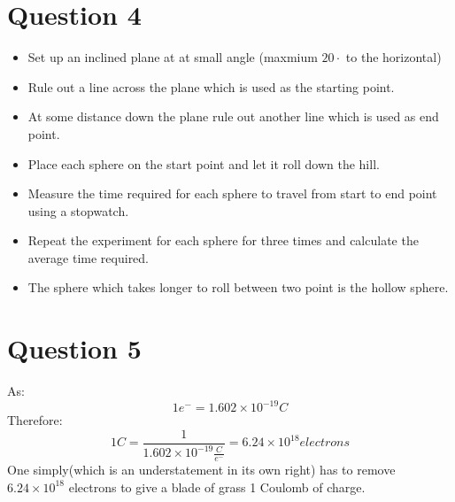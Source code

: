\documentclass[10pt]{article}
\begin{document}
\section{Question 4}
\begin{itemize}
\item Set up an inclined plane at at small angle (maxmium $20 \cdot$ to the horizontal)
\item Rule out a line across the plane which is used as the starting point.
\item At some distance down the plane rule out another line which is used as end point.
\item Place each sphere on the start point and let it roll down the hill.
\item Measure the time required for each sphere to travel from start to end point using a stopwatch.
\item Repeat the experiment for each sphere for three times and calculate the average time required.
\item The sphere which takes longer to roll between two point is the hollow sphere.
\end{itemize}

\section{Question 5}
As:
\begin{displaymath}
1 e^{-} = 1.602 \times 10^{-19} C
\end{displaymath}
Therefore:
\begin{displaymath}
1 C = \frac{1}{1.602 \times 10^{-19} \frac{C}{e^{-}}}= 6.24 \times 10^{18} electrons
\end{displaymath}
One simply(which is an understatement in its own right) has to remove $6.24 \times 10^{18}$ electrons to give a blade of grass 1 Coulomb of charge. 

\pagebreak
\end{document}
